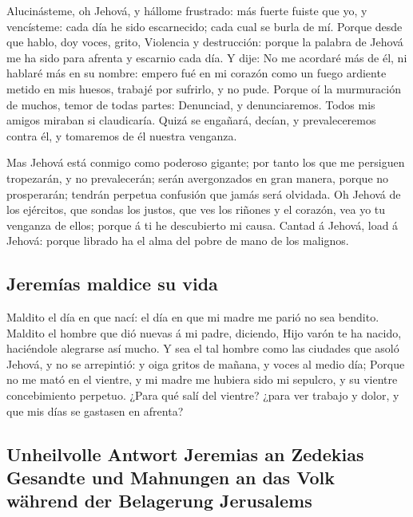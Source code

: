  Alucinásteme, oh Jehová, y hállome frustrado: más fuerte
fuiste que yo, y vencísteme: cada día he sido escarnecido; cada cual se
burla de mí.  Porque desde que hablo, doy voces, grito,
Violencia y destrucción: porque la palabra de Jehová me ha sido para
afrenta y escarnio cada día.  Y dije: No me acordaré más de
él, ni hablaré más en su nombre: empero fué en mi corazón como un fuego
ardiente metido en mis huesos, trabajé por sufrirlo, y no pude.
 Porque oí la murmuración de muchos, temor de todas partes:
Denunciad, y denunciaremos. Todos mis amigos miraban si claudicaría.
Quizá se engañará, decían, y prevaleceremos contra él, y tomaremos de él
nuestra venganza.

 Mas Jehová está conmigo como poderoso gigante; por tanto
los que me persiguen tropezarán, y no prevalecerán; serán avergonzados
en gran manera, porque no prosperarán; tendrán perpetua confusión que
jamás será olvidada.  Oh Jehová de los ejércitos, que
sondas los justos, que ves los riñones y el corazón, vea yo tu venganza
de ellos; porque á ti he descubierto mi causa.  Cantad á
Jehová, load á Jehová: porque librado ha el alma del pobre de mano de
los malignos.

\hypertarget{jeremuxedas-maldice-su-vida}{%
\subsection{Jeremías maldice su
vida}\label{jeremuxedas-maldice-su-vida}}

 Maldito el día en que nací: el día en que mi madre me
parió no sea bendito.  Maldito el hombre que dió nuevas á
mi padre, diciendo, Hijo varón te ha nacido, haciéndole alegrarse así
mucho.  Y sea el tal hombre como las ciudades que asoló
Jehová, y no se arrepintió: y oiga gritos de mañana, y voces al medio
día;  Porque no me mató en el vientre, y mi madre me
hubiera sido mi sepulcro, y su vientre concebimiento perpetuo.
 ¿Para qué salí del vientre? ¿para ver trabajo y dolor, y
que mis días se gastasen en afrenta?

\hypertarget{unheilvolle-antwort-jeremias-an-zedekias-gesandte-und-mahnungen-an-das-volk-wuxe4hrend-der-belagerung-jerusalems}{%
\subsection{Unheilvolle Antwort Jeremias an Zedekias Gesandte und
Mahnungen an das Volk während der Belagerung
Jerusalems}\label{unheilvolle-antwort-jeremias-an-zedekias-gesandte-und-mahnungen-an-das-volk-wuxe4hrend-der-belagerung-jerusalems}}

